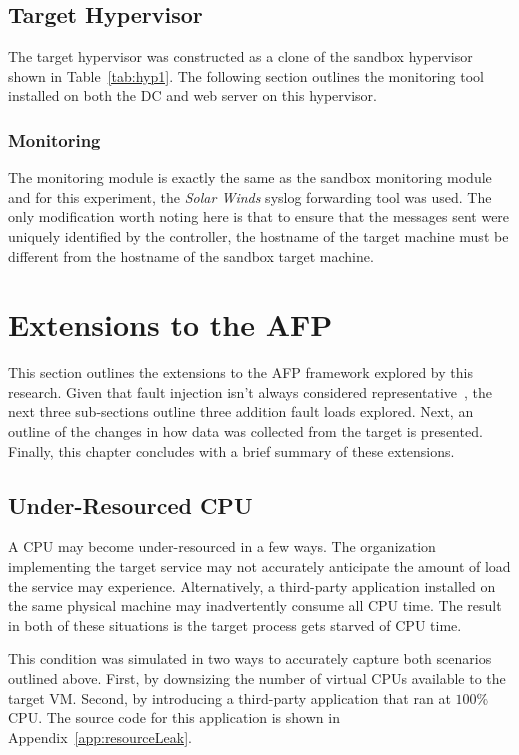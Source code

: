 \subsection{Target Hypervisor} \label{sec:target}
The target hypervisor was constructed as a clone of the sandbox hypervisor
shown in Table~\ref{tab:hyp1}.  The following section outlines the monitoring
tool installed on both the \ac{DC} and web server on this hypervisor.

\subsubsection{Monitoring} \label{sec:targetMonitoringTool}
The monitoring module is exactly the same as the sandbox monitoring module and
for this experiment, the \emph{Solar Winds} syslog forwarding tool was used.
The only modification worth noting here is that to ensure that the messages
sent were uniquely identified by the controller, the hostname of the target
machine must be different from the hostname of the sandbox target machine.

\setcounter{secnumdepth}{3}

\section{Extensions to the \ac{AFP}} \label{sec:extensions}
This section outlines the extensions to the \ac{AFP} framework explored by this
research.  Given that fault injection isn't always considered
representative~\cite{kikuchi2014}, the next three sub-sections outline three
addition fault loads explored.  Next, an outline of the changes in how data was
collected from the target is presented.  Finally, this chapter concludes with a 
brief summary of these extensions.

\subsection{Under-Resourced \ac{CPU}} \label{sec:extUnderResourcedCPU}
A \ac{CPU} may become under-resourced in a few ways.  The organization
implementing the target service may not accurately anticipate the amount of
load the service may experience.  Alternatively, a third-party application
installed on the same physical machine may inadvertently consume all \ac{CPU}
time.  The result in both of these situations is the target process gets
starved of \ac{CPU} time.

This condition was simulated in two ways to accurately capture both scenarios
outlined above.  First, by downsizing the number of virtual \ac{CPU}s available
to the target \ac{VM}.  Second, by introducing a third-party application that
ran at $100\%$ \ac{CPU}.  The source code for this application is shown in
Appendix~\ref{app:resourceLeak}.

